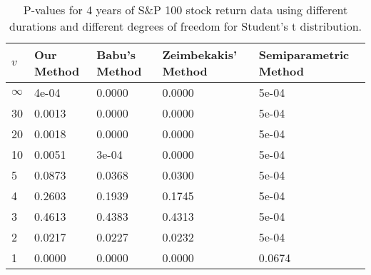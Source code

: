 \begin{table}[ht]
\centering
\caption{P-values for 4 years of S\&P 100 stock return 
                   data using different durations
  and different degrees of freedom for Student's t distribution.} 
\label{table:SP1004}
\begin{tabular}{lllll}
  \hline
$v$ & Our Method & Babu's Method & Zeimbekakis' Method & Semiparametric Method \\ 
  \hline
$\infty$ & 4e-04 & 0.0000 & 0.0000 & 5e-04 \\ 
  30 & 0.0013 & 0.0000 & 0.0000 & 5e-04 \\ 
  20 & 0.0018 & 0.0000 & 0.0000 & 5e-04 \\ 
  10 & 0.0051 & 3e-04 & 0.0000 & 5e-04 \\ 
  5 & 0.0873 & 0.0368 & 0.0300 & 5e-04 \\ 
  4 & 0.2603 & 0.1939 & 0.1745 & 5e-04 \\ 
  3 & 0.4613 & 0.4383 & 0.4313 & 5e-04 \\ 
  2 & 0.0217 & 0.0227 & 0.0232 & 5e-04 \\ 
  1 & 0.0000 & 0.0000 & 0.0000 & 0.0674 \\ 
   \hline
\end{tabular}
\end{table}

